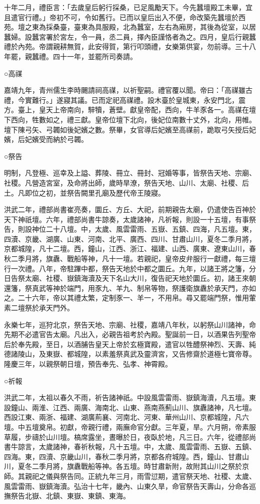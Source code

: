 十年二月，禮臣言：「去歲皇后躬行採桑，已足風勵天下。今先蠶壇殿工未畢，宜且遣官行禮。」帝初不可，令如舊行。已而以皇后出入不便，命改築先蠶壇於西苑。壇之東為採桑臺，臺東為具服殿，北為蠶室，左右為廂房，其後為從室，以居蠶婦。設蠶宮署於宮左，令一員，丞二員，擇內臣謹恪者為之。四月，皇后行親蠶禮於內苑。帝謂親耕無賀，此安得賀，第行叩頭禮，女樂第供宴，勿前導。三十八年罷，親蠶禮。四十一年，並罷所司奏請。

○高禖

嘉靖九年，青州儒生李時颺請祠高禖，以祈聖嗣。禮官覆以聞。帝曰：「高禖雖古禮，今實難行。」遂寢其議。已而定祀高禖禮。設木臺於皇城東，永安門北，震方。臺上，皇天上帝南向，騂犢，蒼壁。獻皇帝配，西向，牛羊豕各一。高禖在壇下西向，牲數如之，禮三獻。皇帝位壇下北向，後妃位南數十丈外，北向，用帷。壇下陳弓矢、弓韣如後妃嬪之數。祭畢，女官導后妃嬪至高禖前，跪取弓矢授后妃嬪，后妃嬪受而納於弓韣。

○祭告

明制，凡登極、巡幸及上謚、葬陵、冊立、冊封、冠婚等事，皆祭告天地、宗廟、社稷。凡營造宮室，及命將出師，歲時旱潦，祭告天地、山川、太廟、社稷、后土。凡即位之初，並祭告闕里孔廟及歷代帝王陵寢。

洪武二年，禮部尚書崔亮奏，圜丘、方丘、大祀，前期親告太廟，仍遣使告百神於天下神祇壇。六年，禮部尚書牛諒奏，太歲諸神，凡祈報，則設一十五壇，有事祭告，則設神位二十八壇。中，太歲、風雲雷雨、五嶽、五鎮、四海，凡五壇。東，四瀆、京畿、湖廣、山東、河南、北平、廣西、四川、甘肅山川，夏冬二季月將，京都城隍，凡十二壇。西，鐘山，江西、浙江、福建、山西、廣東、遼東山川，春秋二季月將，旗纛、戰船等神，凡十一壇。若親祀，皇帝皮弁服行一獻禮，每三壇行一次禮。八年，帝駐蹕中都，祭告天地於中都之圜丘。九年，以諸王將之籓，分日告祭太廟、社稷、嶽鎮海瀆及天下名山大川，復告祀天地於圜丘。初，諸王來朝還籓，祭真武等神於端門，用豕九、羊九、制帛等物，祭護衛旗纛於承天門，亦如之。二十六年，帝以其禮太繁，定制豕一、羊一，不用帛。尋又罷端門祭，惟用葷素二壇祭於承天門外。

永樂七年，巡狩北京，祭告天地、宗廟、社稷，嘉靖八年秋，以躬祭山川諸神，命先期不必遣官告太廟。凡出入，必親告祖考於內殿。聖誕前一日，以酒果告列聖帝后於奉先殿，至日，以酒脯告皇天上帝於玄極寶殿，遣官以牲醴祭神烈、天壽、純德諸陵山，及東嶽、都城隍，以素羞祭真武及靈濟宮，又告修齋於道極七寶帝尊。隆慶三年，以親祭朝日壇，預告奉先、弘孝、神霄殿。

○祈報

洪武二年，太祖以春久不雨，祈告諸神祇。中設風雲雷雨、嶽鎮海瀆，凡五壇。東設鐘山、兩淮、江西、兩廣、海南北、山東、燕南燕薊山川、旗纛諸神，凡七壇。西設江東、兩浙、福建、湖廣荊襄、河南北、河東、華州山川、京都城隍，凡六壇。中五壇奠帛。初獻，帝親行禮，兩廡命官分獻。三年夏，旱。六月朔，帝素服草履，步禱於山川壇。槁席露坐，晝曝於日，夜臥於地，凡三日。六年，從禮部尚書牛諒言，太歲諸神，春祈秋報，凡十五壇。中，太歲、風雲雷雨、五嶽、五鎮、四海。東，四瀆、京畿山川，春秋二季月將，京都各府城隍。西，鐘山、甘肅山川，夏冬二季月將，旗纛戰船等神。各五壇。時甘肅新附，故附其山川之祭於京師。其親祀之儀與祭告同。正統九年三月，雨雪愆期，遣官祭天地、社稷、太歲、風雲雷雨、嶽鎮海瀆。弘治十七年，畿內、山東久旱，命官祭告天壽山，分命各巡撫祭告北嶽、北鎮、東嶽、東鎮、東海。

